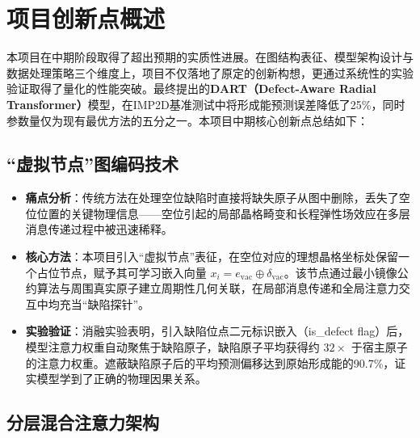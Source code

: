 

\chapter{项目创新点概述}

本项目在中期阶段取得了超出预期的实质性进展。在图结构表征、模型架构设计与数据处理策略三个维度上，项目不仅落地了原定的创新构想，更通过系统性的实验验证取得了量化的性能突破。最终提出的\textbf{DART（Defect-Aware Radial Transformer）}模型，在IMP2D基准测试中将形成能预测误差降低了25\%，同时参数量仅为现有最优方法的五分之一。本项目中期核心创新点总结如下：

\section{``虚拟节点''图编码技术}

\begin{itemize}
    \item \textbf{痛点分析}：传统方法在处理空位缺陷时直接将缺失原子从图中删除，丢失了空位位置的关键物理信息——空位引起的局部晶格畸变和长程弹性场效应在多层消息传递过程中被迅速稀释。

    \item \textbf{核心方法}：本项目引入``虚拟节点''表征，在空位对应的理想晶格坐标处保留一个占位节点，赋予其可学习嵌入向量 $x_i = e_{\mathrm{vac}} \oplus \delta_{\mathrm{vac}}$。该节点通过最小镜像公约算法与周围真实原子建立周期性几何关联，在局部消息传递和全局注意力交互中均充当``缺陷探针''。

    \item \textbf{实验验证}：消融实验表明，引入缺陷位点二元标识嵌入（is\_defect flag）后，模型注意力权重自动聚焦于缺陷原子，缺陷原子平均获得约 $32\times$ 于宿主原子的注意力权重。遮蔽缺陷原子后的平均预测偏移达到原始形成能的90.7\%，证实模型学到了正确的物理因果关系。
\end{itemize}

\section{分层混合注意力架构}

